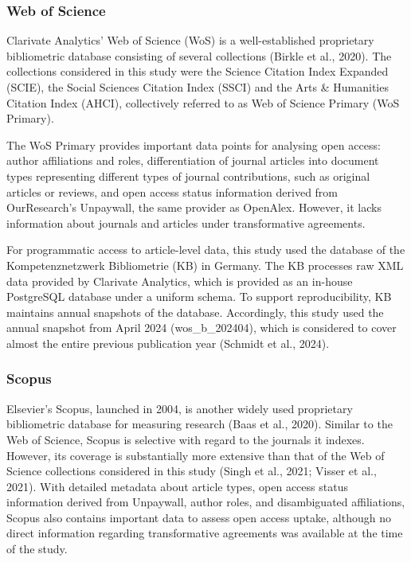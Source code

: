 \documentclass[a4paper,man,floatsintext,longtable,noextraspace,10pt]{apa6}
\begin{document}
\subsubsection{Web of Science}\label{web-of-science}

Clarivate Analytics' Web of Science (WoS) is a well-established
proprietary bibliometric database consisting of several collections
(Birkle et al., 2020). The collections considered in this study were the
Science Citation Index Expanded (SCIE), the Social Sciences Citation
Index (SSCI) and the Arts \& Humanities Citation Index (AHCI),
collectively referred to as Web of Science Primary (WoS Primary).

The WoS Primary provides important data points for analysing open
access: author affiliations and roles, differentiation of journal
articles into document types representing different types of journal
contributions, such as original articles or reviews, and open access
status information derived from OurResearch's Unpaywall, the same
provider as OpenAlex. However, it lacks information about journals and
articles under transformative agreements.

For programmatic access to article-level data, this study used the
database of the Kompetenznetzwerk Bibliometrie (KB) in Germany. The KB
processes raw XML data provided by Clarivate Analytics, which is
provided as an in-house PostgreSQL database under a uniform schema. To
support reproducibility, KB maintains annual snapshots of the database.
Accordingly, this study used the annual snapshot from April 2024
(wos\_b\_202404), which is considered to cover almost the entire
previous publication year (Schmidt et al., 2024).

\subsubsection{Scopus}\label{scopus}

Elsevier's Scopus, launched in 2004, is another widely used proprietary
bibliometric database for measuring research (Baas et al., 2020).
Similar to the Web of Science, Scopus is selective with regard to the
journals it indexes. However, its coverage is substantially more
extensive than that of the Web of Science collections considered in this
study (Singh et al., 2021; Visser et al., 2021). With detailed metadata
about article types, open access status information derived from
Unpaywall, author roles, and disambiguated affiliations, Scopus also
contains important data to assess open access uptake, although no direct
information regarding transformative agreements was available at the
time of the study.
\end{document}
